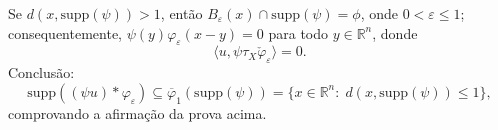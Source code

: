 \documentclass[../distribution_theory_notes.tex]{subfiles}
\begin{document}
\begin{exr}
	Se \(d(x, \mathrm{supp}(\psi ))>1\), então \(B_{\varepsilon }(x)\cap \mathrm{supp}(\psi ) = \phi\), onde \(0<\varepsilon \leq 1\); consequentemente, \(\psi (y)\varphi_{\varepsilon }(x-y)=0\) para todo \(y\in \mathbb{R}^{n}\), donde
	\[
		\langle u, \psi \tau_{X}\check{\varphi }_{\varepsilon } \rangle =0.
	\]
	Conclusão:
	\[
		\mathrm{supp}((\psi u)*\varphi_{\varepsilon })\subseteq \overline{\varphi }_{1}(\mathrm{supp}(\psi )) = \{x\in \mathbb{R}^{n}:\; d(x, \mathrm{supp}(\psi ))\leq 1\},
	\]
	comprovando a afirmação da prova acima.
\end{exr}
\end{document}
